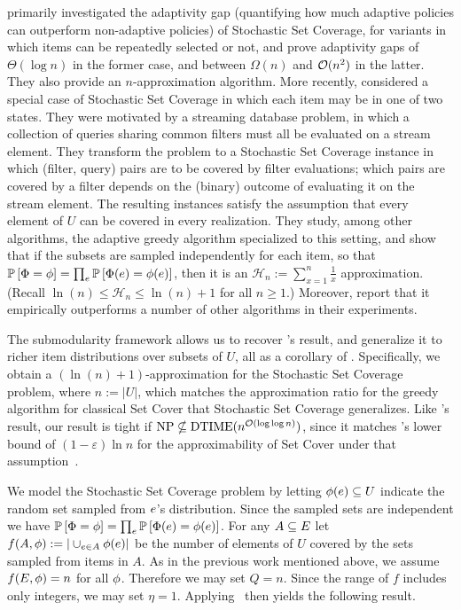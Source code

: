 \citeauthor{goemans06stochastic} primarily
investigated the adaptivity gap (quantifying how much adaptive policies can outperform non-adaptive policies) of Stochastic Set Coverage, for variants in which
items can be repeatedly selected or not, and prove adaptivity gaps of
$\Theta(\log n)$ in the former case, and between $\Omega(n)$ and
${\mathcal{O}}(n^2)$ in the latter.  They also provide an $n$-approximation
algorithm.
%
More recently, \citet{liu08near} considered a special case of
Stochastic Set Coverage in which each item may be in one of two
states.  
They were motivated by a streaming database problem, in which a
collection of queries sharing common filters must all be evaluated on
a stream element.  They transform the problem to a Stochastic Set
Coverage instance in which (filter, query) pairs are to be covered by filter
evaluations;  which pairs are covered by a filter depends on the
(binary) outcome of evaluating it on the stream element.  
The resulting instances satisfy the assumption that 
every element of $U$ can be covered in every realization. 
They study, among other algorithms, the adaptive greedy algorithm
specialized to this setting, and show that if 
the subsets are sampled independently for each item, so that 
$\mathbb{P}\left[{\color{black}{\ensuremath{\Phi}}} = {\color{black}{\ensuremath{\phi}}}\right]  = \prod_{e} \mathbb{P}\left[{\color{black}{\ensuremath{\Phi}}}(e) = {\color{black}{\ensuremath{\phi}}}(e)\right] $,
then it is an $\mathcal{H}_{n} := \sum_{x=1}^{n} \frac{1}{x}$
approximation.
(Recall $\ln(n) \le \mathcal{H}_{n} \le \ln(n)+1$ for all $n \ge 1$.)  
Moreover,  \citeauthor{liu08near} report that it
empirically outperforms a number of other algorithms in their experiments.

The \term submodularity framework allows us to recover \citeauthor{liu08near}'s 
result, and 
generalize it to richer item distributions over subsets of $U$, all as a corollary of .
Specifically, we obtain a $(\ln(n) + 1)$-approximation for the Stochastic Set Coverage problem, where $n := |U|$, which matches the approximation ratio for the greedy algorithm for classical Set Cover that 
Stochastic Set Coverage generalizes.
Like \citeauthor{liu08near}'s result,
our result is tight if $\textrm{NP} \nsubseteq \text{DTIME}(n^{{\mathcal{O}}(\log\log n)})$, since it
matches 
\citeauthor{feige98threshold}'s 
lower bound of $(1-\varepsilon)\ln n$ for the approximability of Set Cover under that assumption~\citep{feige98threshold}.

We model the Stochastic Set Coverage problem by letting ${\color{black}{\ensuremath{\phi}}}(e)
\subseteq U$ indicate the random set sampled from $e$'s
distribution.  Since the sampled sets are independent we have 
$\mathbb{P}\left[{\color{black}{\ensuremath{\Phi}}} = {\color{black}{\ensuremath{\phi}}}\right]  = \prod_{e} \mathbb{P}\left[{\color{black}{\ensuremath{\Phi}}}(e) = {\color{black}{\ensuremath{\phi}}}(e)\right] $.  For any $A \subseteq E$ let  
$f(A, {\color{black}{\ensuremath{\phi}}}) := |\cup_{e \in A} {\color{black}{\ensuremath{\phi}}}(e) |$ be the number of elements of $U$ covered by the sets sampled from items in $A$.   
As in the previous work mentioned above, we assume $f(E,
{\color{black}{\ensuremath{\phi}}}) = n$ for all ${\color{black}{\ensuremath{\phi}}}$.  Therefore we may set $Q = n$.  Since the
range of $f$ includes only integers,  
we may set $\eta = 1$.  Applying~ then yields the following result.


